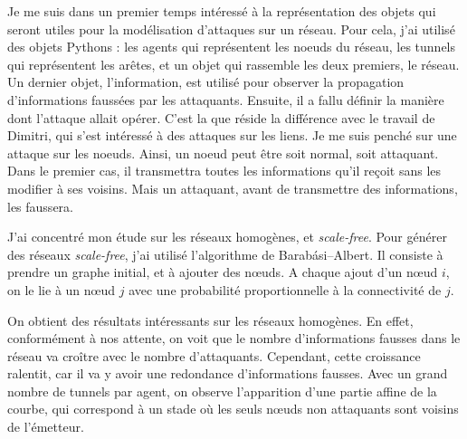 \documentclass[11pt,a4paper]{article}
\begin{document}
	Je me suis dans un premier temps intéressé à la représentation des objets qui seront utiles pour la modélisation d'attaques sur un réseau.  Pour cela, j'ai utilisé des objets Pythons : les agents qui représentent les noeuds du réseau, les tunnels qui représentent les arêtes, et un objet qui rassemble les deux premiers, le réseau. Un dernier objet, l'information, est utilisé pour observer la propagation d'informations faussées par les attaquants. Ensuite, il a fallu définir la manière dont l'attaque allait opérer. C'est la que réside la différence avec le travail de Dimitri, qui s'est intéressé à des attaques sur les liens. Je me suis penché sur une attaque sur les noeuds. Ainsi, un noeud peut être soit normal, soit attaquant. Dans le premier cas, il transmettra toutes les informations qu'il reçoit sans les modifier à ses voisins. Mais un attaquant, avant de transmettre des informations, les faussera. 
	
\begin{center}
\end{center} 

	J'ai concentré mon étude sur les réseaux homogènes, et \emph{scale-free}. Pour générer des réseaux \emph{scale-free}, j'ai utilisé l'algorithme de Barabási–Albert. Il consiste à prendre un graphe initial, et à ajouter des nœuds. A chaque ajout d'un nœud $i$, on le lie à un nœud $j$ avec une probabilité proportionnelle à la connectivité de $j$.
	
	
	On obtient des résultats intéressants sur les réseaux homogènes. En effet, conformément à nos attente, on voit que le nombre d'informations fausses dans le réseau va croître avec le nombre d'attaquants. Cependant, cette croissance ralentit, car il va y avoir une redondance d'informations fausses. Avec un grand nombre de tunnels par agent, on observe l'apparition d'une partie affine de la courbe, qui correspond à un stade où les seuls nœuds non attaquants sont voisins de l'émetteur.
	
\end{document}
